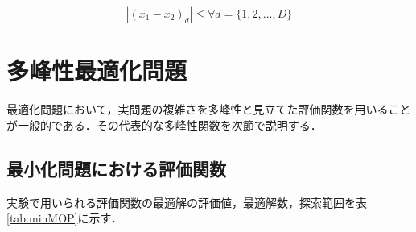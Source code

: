 \documentclass[a4j,11pt]{jarticle}
\begin{document}
\begin{equation}
|(x_1-x_2)_d| \leq \forall d = \{1,2,...,D\}
\end{equation}
\newpage
\section{多峰性最適化問題}
\label{sec:MOP}
最適化問題において，実問題の複雑さを多峰性と見立てた評価関数を用いることが一般的である．その代表的な多峰性関数を次節で説明する．


\subsection{最小化問題における評価関数}
\label{ss:MinFunc}
実験で用いられる評価関数の最適解の評価値，最適解数，探索範囲を表\ref{tab:minMOP}に示す．
\end{document}
